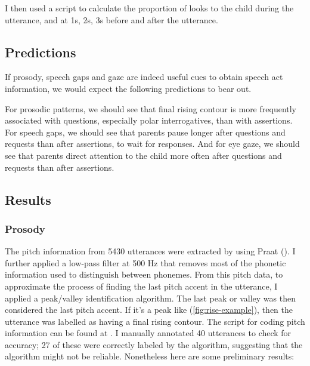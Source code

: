 I then used a script to calculate the proportion of looks to the child during the utterance, and at 1s, 2s, 3s before and after the utterance.%

\subsection{Predictions}
\label{sec:engsp:predictions}
If prosody, speech gaps and gaze are indeed useful cues to obtain speech act information, we would expect the following predictions to bear out.

For prosodic patterns, we should see that final rising contour is more frequently associated with questions, especially polar interrogatives, than with assertions.
For speech gaps, we should see that parents pause longer after questions and requests than after assertions, to wait for responses.
And for eye gaze, we should see that parents direct attention to the child more often after questions and requests than after assertions. 


\subsection{Results}
\label{sec:engsp:results}

\subsubsection{Prosody}
\label{sec:engsp:results:prosody}
The pitch information from 5430 utterances were extracted by using Praat (\citealt{praat}). I further applied a low-pass filter at 500 Hz that removes most of the phonetic information used to distinguish between phonemes. From this pitch data, to approximate the process of finding the last pitch accent in the utterance, I applied a peak/valley identification algorithm. The last peak or valley was then considered the last pitch accent. If it's a peak like (\ref{fig:rise-example}), then the utterance was labelled as having a final rising contour. The script for coding pitch information can be found at \mycode{}. I manually annotated 40 utterances to check for accuracy; 27 of these were correctly labeled by the algorithm, suggesting that the algorithm might not be reliable. Nonetheless here are some preliminary results:  


